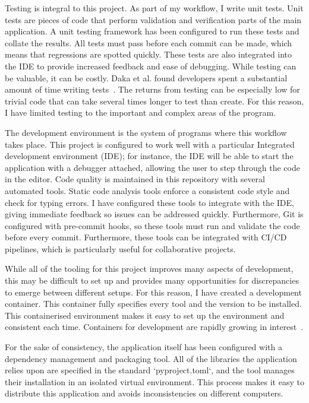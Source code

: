 \documentclass[]{final_report}
\begin{document}
\newpage
Testing is integral to this project. As part of my workflow, I write unit tests. Unit tests are pieces of code that perform validation and verification parts of the main application. A unit testing framework has been configured to run these tests and collate the results. All tests must pass before each commit can be made, which means that regressions are spotted quickly. These tests are also integrated into the IDE to provide increased feedback and ease of debugging. While testing can be valuable, it can be costly. Daka et al. found developers spent a substantial amount of time writing tests~\cite{unitTestingSurvey}. The returns from testing can be especially low for trivial code that can take several times longer to test than create. For this reason, I have limited testing to the important and complex areas of the program.  

The development environment is the system of programs where this workflow takes place. This project is configured to work well with a particular Integrated development environment (IDE); for instance, the IDE will be able to start the application with a debugger attached, allowing the user to step through the code in the editor. Code quality is maintained in this repository with several automated tools. Static code analysis tools enforce a consistent code style and check for typing errors. I have configured these tools to integrate with the IDE, giving immediate feedback so issues can be addressed quickly. Furthermore, Git is configured with pre-commit hooks, so these tools must run and validate the code before every commit. Furthermore, these tools can be integrated with CI/CD pipelines, which is particularly useful for collaborative projects.

While all of the tooling for this project improves many aspects of development, this may be difficult to set up and provides many opportunities for discrepancies to emerge between different setups. For this reason, I have created a development container. This container fully specifies every tool and the version to be installed. This containerised environment makes it easy to set up the environment and consistent each time. Containers for development are rapidly growing in interest~\cite{developmentContainers}. 

For the sake of consistency, the application itself has been configured with a dependency management and packaging tool. All of the libraries the application relies upon are specified in the standard `pyproject.toml`, and the tool manages their installation in an isolated virtual environment. This process makes it easy to distribute this application and avoids inconsistencies on different computers.
\end{document}
